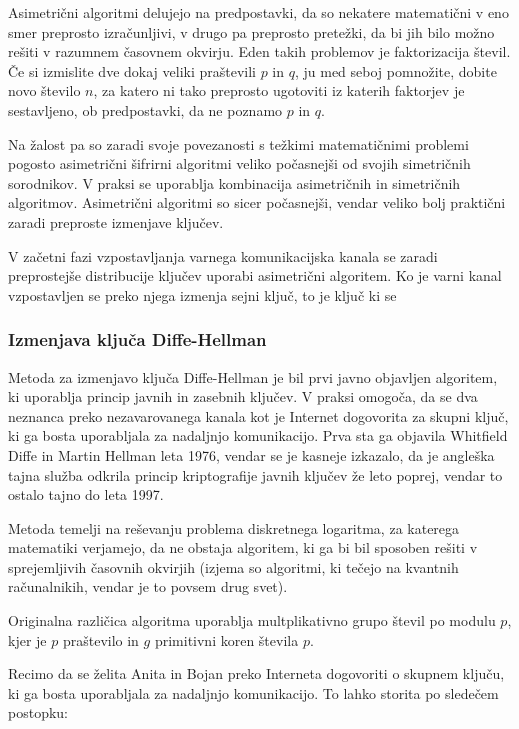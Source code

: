 \documentclass[12pt,a4paper,openany]{book}
\begin{document}
Asimetrični algoritmi delujejo na predpostavki, da so nekatere matematični v eno smer preprosto izračunljivi, v drugo pa preprosto pretežki, da bi jih bilo možno rešiti v razumnem časovnem okvirju. Eden takih problemov je faktorizacija števil. Če si izmislite dve dokaj veliki praštevili $p$ in $q$, ju med seboj pomnožite, dobite novo število $n$, za katero ni tako preprosto ugotoviti iz katerih faktorjev je sestavljeno, ob predpostavki, da ne poznamo $p$ in $q$.

Na žalost pa so zaradi svoje povezanosti s težkimi matematičnimi problemi pogosto asimetrični šifrirni algoritmi veliko počasnejši od svojih simetričnih sorodnikov. V praksi se uporablja kombinacija asimetričnih in simetričnih algoritmov. Asimetrični algoritmi so sicer počasnejši, vendar veliko bolj praktični zaradi preproste izmenjave ključev.


V začetni fazi vzpostavljanja varnega komunikacijska kanala se zaradi preprostejše distribucije ključev uporabi asimetrični algoritem. Ko je varni kanal vzpostavljen se preko njega izmenja sejni ključ, to je ključ ki se

\subsubsection{Izmenjava ključa Diffe-Hellman}

Metoda za izmenjavo ključa Diffe-Hellman je bil prvi javno objavljen algoritem, ki uporablja princip javnih in zasebnih ključev. V praksi omogoča, da se dva neznanca preko nezavarovanega kanala kot je Internet dogovorita za skupni ključ, ki ga bosta uporabljala za nadaljnjo komunikacijo. Prva sta ga objavila Whitfield Diffe in Martin Hellman leta 1976, vendar se je kasneje izkazalo, da je angleška tajna služba odkrila princip kriptografije javnih ključev že leto poprej, vendar to ostalo tajno do leta 1997.

Metoda temelji na reševanju problema diskretnega logaritma, za katerega matematiki verjamejo, da ne obstaja algoritem, ki ga bi bil sposoben rešiti v sprejemljivih časovnih okvirjih (izjema so algoritmi, ki tečejo na kvantnih računalnikih, vendar je to povsem drug svet).

Originalna različica algoritma uporablja multplikativno grupo števil po modulu $p$, kjer je $p$ praštevilo in $g$ primitivni koren števila $p$.

Recimo da se želita Anita in Bojan preko Interneta dogovoriti o skupnem ključu, ki ga bosta uporabljala za nadaljnjo komunikacijo. To lahko storita po sledečem postopku:
\end{document}

